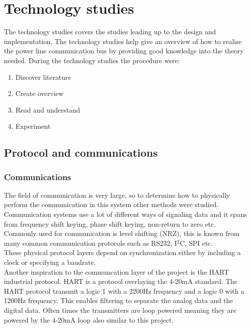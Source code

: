 \chapter{Technology studies}

The technology studies covers the studies leading up to the design and implementation. The technology studies help give an overview of how to realise the power line communication bus by providing good knowledge into the theory needed. During the technology studies the procedure were:
\begin{enumerate}
\item Discover literature
\item Create overview
\item Read and understand
\item Experiment
\end{enumerate}
\section{Protocol and communications}
\subsection{Communications}
The field of communication is very large, so to determine how to physically perform the communication in this system other methods were studied.\\
Communication systems use a lot of different ways of signaling data and it spans from frequency shift keying, phase shift keying, non-return to zero etc.
Commonly used for communication is level shifting (NRZ), this is known from many common communication protocols such as RS232, I$^2$C, SPI etc.\\
These physical protocol layers depend on synchronization either by including a clock or specifying a baudrate.\\
Another inspiration to the communcation layer of the project is the HART industrial protocol. HART is a protocol overlaying the 4-20mA standard. The HART protocol transmit a logic 1 with a 2200Hz frequency and a logic 0 with a 1200Hz frequency. This enables filtering to separate the analog data and the digital data. Often times the transmitters are loop powered meaning they are powered by the 4-20mA loop also similar to this project.
